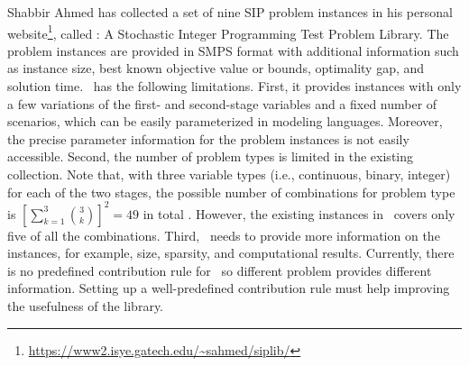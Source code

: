 Shabbir Ahmed has collected a set of nine SIP problem instances in his personal website\footnote{\url{https://www2.isye.gatech.edu/~sahmed/siplib/}}, called \siplib: A Stochastic Integer Programming Test Problem Library. The problem instances are provided in SMPS format \cite{smps} with additional information such as instance size, best known objective value or bounds, optimality gap, and solution time. \siplib\ has the following limitations. 
First, it provides instances with only a few variations of the first- and second-stage variables and a fixed number of scenarios, which can be easily parameterized in 
modeling languages. Moreover, the precise parameter information for the problem instances is 
not easily accessible. Second, the number of problem types is limited in 
the existing collection. Note that, with three variable types (i.e., continuous, 
binary, integer) for each of the two stages, the possible number of combinations for problem type is $\left[\sum_{k=1}
^3\binom{3}{k}\right]^2=49$ in total . 
\textcolor{NavyBlue}{However, the existing instances in \siplib\ covers only five of all the combinations.}
\textcolor{NavyBlue}{Third, \siplib\ needs to provide more information on the instances, for example, size, sparsity, and computational results. Currently, there is no predefined contribution rule for \siplib\ so different problem provides different information. Setting up a well-predefined contribution rule must help improving the usefulness of the library.} 


